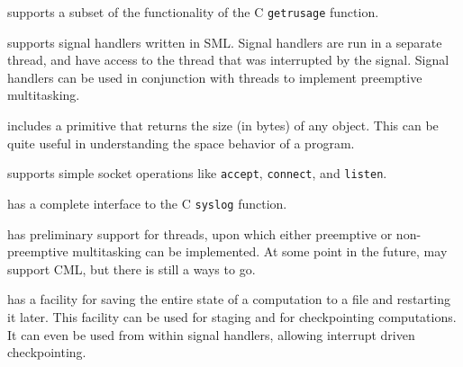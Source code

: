 \begin{description}
\begin{description}
{\mlton} supports a subset of the functionality of the C {\tt getrusage}
function.

{\mlton} supports signal handlers written in SML.  Signal handlers are 
run in a separate thread, and have access to the thread that was
interrupted by the signal.  Signal handlers can be used in conjunction with
threads to implement preemptive multitasking.

{\mlton} includes a primitive that returns the size (in bytes) of any
object.  This can be quite useful in understanding the space behavior
of a program.

{\mlton} supports simple socket operations like {\tt accept}, 
{\tt connect}, and {\tt listen}.

{\mlton} has a complete interface to the C {\tt syslog} function.

{\mlton} has preliminary support for threads, upon which either
preemptive or non-preemptive multitasking can be implemented.  At some
point in the future, {\mlton} may support CML, but there is still a
ways to go.

{\mlton} has a facility for saving the entire state of a computation
to a file and restarting it later.  This facility can be used for
staging and for checkpointing computations.  It can even be used from
within signal handlers, allowing interrupt driven checkpointing.

\end{description}
\end{description}

